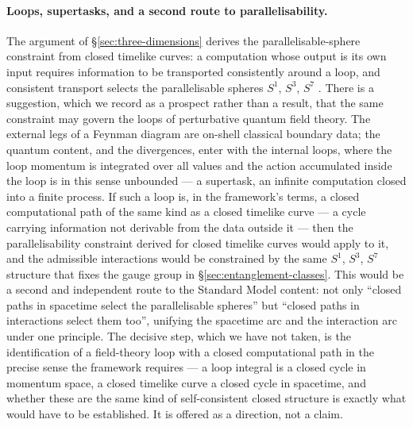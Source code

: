 \paragraph{Loops, supertasks, and a second route to parallelisability.}
The argument of \S\ref{sec:three-dimensions} derives the parallelisable-sphere constraint from
closed timelike curves: a computation whose output is its own input requires information to be
transported consistently around a loop, and consistent transport selects the parallelisable spheres
$S^{1}$, $S^{3}$, $S^{7}$ \autocite{adams1960hopf}. There is a suggestion, which we record as a
prospect rather than a result, that the same constraint may govern the loops of perturbative quantum
field theory. The external legs of a Feynman diagram are on-shell classical boundary data; the
quantum content, and the divergences, enter with the internal loops, where the loop momentum is
integrated over all values and the action accumulated inside the loop is in this sense unbounded ---
a supertask, an infinite computation closed into a finite process. If such a loop is, in the
framework's terms, a closed computational path of the same kind as a closed timelike curve --- a
cycle carrying information not derivable from the data outside it --- then the parallelisability
constraint derived for closed timelike curves would apply to it, and the admissible interactions
would be constrained by the same $S^{1}$, $S^{3}$, $S^{7}$ structure that fixes the gauge group in
\S\ref{sec:entanglement-classes}. This would be a second and independent route to the Standard Model
content: not only \enquote{closed paths in spacetime select the parallelisable spheres} but \enquote{closed paths in interactions select them too}, unifying the spacetime arc and the interaction arc under one
principle. The decisive step, which we have not taken, is the identification of a field-theory loop
with a closed computational path in the precise sense the framework requires --- a loop integral is a
closed cycle in momentum space, a closed timelike curve a closed cycle in spacetime, and whether
these are the same kind of self-consistent closed structure is exactly what would have to be
established. It is offered as a direction, not a claim.

